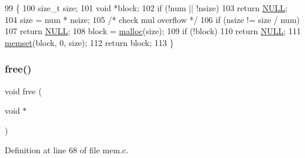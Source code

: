 \begin{DoxyCode}
99 \{
100     \textcolor{keywordtype}{size\_t} size;
101     \textcolor{keywordtype}{void} *block;
102     \textcolor{keywordflow}{if} (!num || !nsize)
103         \textcolor{keywordflow}{return} \hyperlink{a00140_a070d2ce7b6bb7e5c05602aa8c308d0c4_a070d2ce7b6bb7e5c05602aa8c308d0c4}{NULL};
104     size = num * nsize;
105     \textcolor{comment}{/* check mul overflow */}
106     \textcolor{keywordflow}{if} (nsize != size / num)
107         \textcolor{keywordflow}{return} \hyperlink{a00140_a070d2ce7b6bb7e5c05602aa8c308d0c4_a070d2ce7b6bb7e5c05602aa8c308d0c4}{NULL};
108     block = \hyperlink{a00167_a7ac38fce3243a7dcf448301ee9ffd392_a7ac38fce3243a7dcf448301ee9ffd392}{malloc}(size);
109     \textcolor{keywordflow}{if} (!block)
110         \textcolor{keywordflow}{return} \hyperlink{a00140_a070d2ce7b6bb7e5c05602aa8c308d0c4_a070d2ce7b6bb7e5c05602aa8c308d0c4}{NULL};
111     \hyperlink{a00131_a9e432f267691eceb2e2e0efcc37efbc9_a9e432f267691eceb2e2e0efcc37efbc9}{memset}(block, 0, size);
112     \textcolor{keywordflow}{return} block;
113 \}
\end{DoxyCode}
\mbox{\label{a00170_af07d89f5ceaea0c7c8252cc41fd75f37_af07d89f5ceaea0c7c8252cc41fd75f37}} 
\subsubsection{\texorpdfstring{free()}{free()}}
{\footnotesize\ttfamily void free (\begin{DoxyParamCaption}\item[{void $\ast$}]{ }\end{DoxyParamCaption})}



Definition at line 68 of file mem.\+c.


